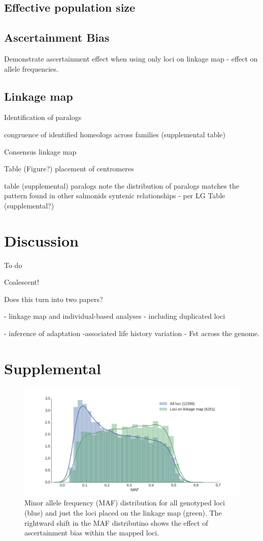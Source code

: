 \documentclass[12pt,  one column]{article}
\begin{document}
\subsection*{Effective population size}

\subsection*{Ascertainment Bias}
Demonstrate ascertainment effect when using only loci on linkage map - effect on allele frequencies.

\subsection*{Linkage map}
Identification of paralogs

congruence of identified homeologs across families (supplemental table)

Consensus linkage map

Table (Figure?)
placement of centromeres

table (supplemental)
paralogs
note the distribution of paralogs matches the  pattern found in other salmonids
syntenic relationships - per LG
Table (supplemental?)

\section*{Discussion}
To do

Coalescent!

Does this turn into two papers?

 - linkage map and individual-based analyses - including duplicated loci

 - inference of adaptation -associated  life history variation  - Fst across the genome.

\pagebreak
\section*{Supplemental}

\begin{figure}[H]
\includegraphics[scale=.3]{figures/supplemental/ascertainment.png}
\caption{Minor allele frequency (MAF) distribution for all genotyped loci (blue) and just the loci placed on the linkage map (green). The rightward shift in the MAF distributino shows the effect of ascertainment bias within the mapped loci.}
\end{figure}
\end{document}
